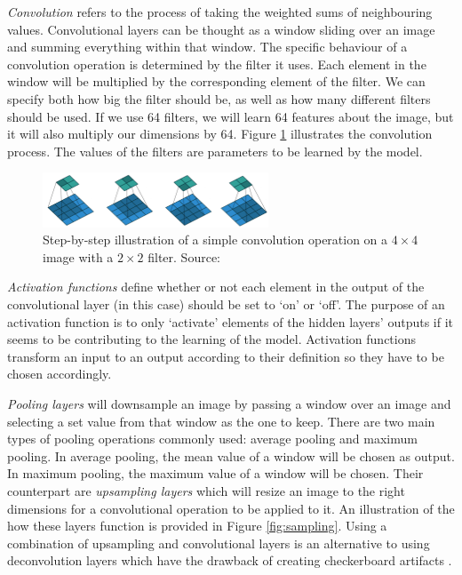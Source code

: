 \textit{Convolution} refers to the process of taking the weighted sums of neighbouring values. Convolutional layers can be thought as a window sliding over an image and summing everything within that window. The specific behaviour of a convolution operation is determined by the filter it uses. Each element in the window will be multiplied by the corresponding element of the filter. We can specify both how big the filter should be, as well as how many different filters should be used. If we use 64 filters, we will learn 64 features about the image, but it will also multiply our dimensions by 64. Figure \ref{fig:convolution} illustrates the convolution process. The values of the filters are parameters to be learned by the model.

\begin{figure}[h]
    \centering
    \includegraphics[width=0.6\textwidth]{dissertation/figures/convolution_operation.png}
    \caption{Step-by-step illustration of a simple convolution operation on a $4\times4$ image with a $2\times2$ filter. Source: \citet{dumoulin2016guide}}
    \label{fig:convolution}
\end{figure}

\textit{Activation functions} define whether or not each element in the output of the convolutional layer (in this case) should be set to `on' or `off'. The purpose of an activation function is to only `activate' elements of the hidden layers' outputs if it seems to be contributing to the learning of the model. Activation functions transform an input to an output according to their definition so they have to be chosen accordingly.

\textit{Pooling layers} will downsample an image by passing a window over an image and selecting a set value from that window as the one to keep. There are two main types of pooling operations commonly used: average pooling and maximum pooling. In average pooling, the mean value of a window will be chosen as output. In maximum pooling, the maximum value of a window will be chosen. Their counterpart are \textit{upsampling layers} which will resize an image to the right dimensions for a convolutional operation to be applied to it. An illustration of the how these layers function is provided in Figure \ref{fig:sampling}. Using a combination of upsampling and convolutional layers is an alternative to using deconvolution layers which have the drawback of creating checkerboard artifacts \citep{odena2016deconvolution}.

